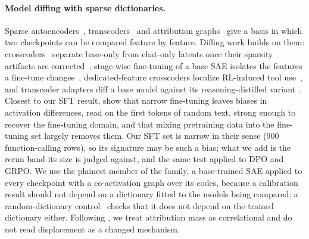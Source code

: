 \documentclass{article}
\begin{document}
\paragraph{Model diffing with sparse dictionaries.} Sparse autoencoders~\citep{bricken2023monosemanticity,templeton2024scaling,gao2024scaling}, transcoders~\citep{dunefsky2024transcoders} and attribution graphs~\citep{ameisen2025circuit,lindsey2025biology,marks2024sparse_circuits} give a basis in which two checkpoints can be compared feature by feature. Diffing work builds on them: crosscoders~\citep{lindsey2024crosscoders} separate base-only from chat-only latents once their sparsity artifacts are corrected~\citep{minder2025crosscoders}, stage-wise fine-tuning of a base SAE isolates the features a fine-tune changes~\citep{bricken2024stagewise}, dedicated-feature crosscoders localize RL-induced tool use~\citep{crosscoder_tooluse2026}, and transcoder adapters diff a base model against its reasoning-distilled variant~\citep{transcoder_diffing2026}. Closest to our SFT result, \citet{minder2025narrow} show that narrow fine-tuning leaves biases in activation differences, read on the first tokens of random text, strong enough to recover the fine-tuning domain, and that mixing pretraining data into the fine-tuning set largely removes them. Our SFT set is narrow in their sense ($900$ function-calling rows), so its signature may be such a bias; what we add is the rerun band its size is judged against, and the same test applied to DPO and GRPO. We use the plainest member of the family, a base-trained SAE applied to every checkpoint with a co-activation graph over its codes, because a calibration result should not depend on a dictionary fitted to the models being compared; a random-dictionary control~\citep{korznikov2026sanity} checks that it does not depend on the trained dictionary either. Following \citet{five_stage_causal_sae2026}, we treat attribution mass as correlational and do not read displacement as a changed mechanism.
\end{document}
